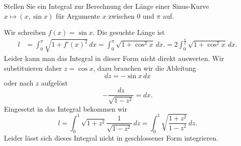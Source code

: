 Stellen Sie ein Integral zur Berechnung der Länge einer Sinus-Kurve
$x\mapsto (x,\sin x)$
für Argumente $x$ zwischen $0$ und $\pi$ auf.

\begin{loesung}
Wir schreiben $f(x)=\sin x$.
Die gesuchte Länge ist
\begin{align*}
l
&=
\int_0^\pi\sqrt{1 + f'(x)^2}\,dx
=
\int_0^\pi\sqrt{1 + \cos^2x}\,dx.
=
2
\int_0^{\frac\pi2}\sqrt{1 + \cos^2x}\,dx.
\end{align*}
Leider kann man das Integral in dieser Form nicht direkt 
auswerten.
Wir substituieren daher $z=\cos x$, dazu brauchen wir die
Ableitung
\[
dz=-\sin x\,dx
\]
oder nach $z$ aufgelöst
\[
-\frac{dz}{\sqrt{1-z^2}}=dx.
\]
Eingesetzt in das Integral bekommen wir
\[
l=
\int_0^1 \sqrt{1+z^2}\frac1{\sqrt{1-z^2}}\,dz
=
\int_0^1 \sqrt{\frac{1+z^2}{1-z^2}}\,dz.
\]
Leider lässt sich dieses Integral nicht in geschlossener Form
integrieren.
\end{loesung}

